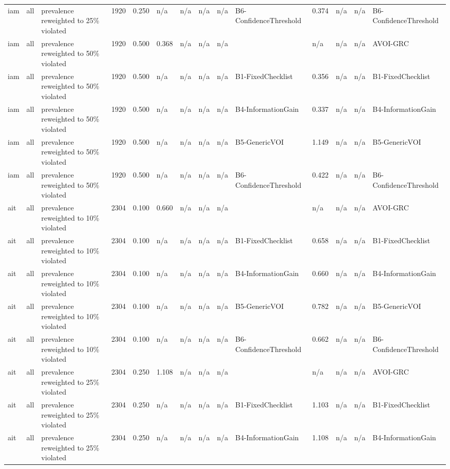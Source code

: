 \begin{table}[!ht]
{\begin{tabular}{llllllllllllll}
iam & all & prevalence reweighted to 25\% violated & 1920 & 0.250 & n/a & n/a & n/a & n/a & B6-ConfidenceThreshold & 0.374 & n/a & n/a & B6-ConfidenceThreshold \\
iam & all & prevalence reweighted to 50\% violated & 1920 & 0.500 & 0.368 & n/a & n/a & n/a &  & n/a & n/a & n/a & AVOI-GRC \\
iam & all & prevalence reweighted to 50\% violated & 1920 & 0.500 & n/a & n/a & n/a & n/a & B1-FixedChecklist & 0.356 & n/a & n/a & B1-FixedChecklist \\
iam & all & prevalence reweighted to 50\% violated & 1920 & 0.500 & n/a & n/a & n/a & n/a & B4-InformationGain & 0.337 & n/a & n/a & B4-InformationGain \\
iam & all & prevalence reweighted to 50\% violated & 1920 & 0.500 & n/a & n/a & n/a & n/a & B5-GenericVOI & 1.149 & n/a & n/a & B5-GenericVOI \\
iam & all & prevalence reweighted to 50\% violated & 1920 & 0.500 & n/a & n/a & n/a & n/a & B6-ConfidenceThreshold & 0.422 & n/a & n/a & B6-ConfidenceThreshold \\
ait & all & prevalence reweighted to 10\% violated & 2304 & 0.100 & 0.660 & n/a & n/a & n/a &  & n/a & n/a & n/a & AVOI-GRC \\
ait & all & prevalence reweighted to 10\% violated & 2304 & 0.100 & n/a & n/a & n/a & n/a & B1-FixedChecklist & 0.658 & n/a & n/a & B1-FixedChecklist \\
ait & all & prevalence reweighted to 10\% violated & 2304 & 0.100 & n/a & n/a & n/a & n/a & B4-InformationGain & 0.660 & n/a & n/a & B4-InformationGain \\
ait & all & prevalence reweighted to 10\% violated & 2304 & 0.100 & n/a & n/a & n/a & n/a & B5-GenericVOI & 0.782 & n/a & n/a & B5-GenericVOI \\
ait & all & prevalence reweighted to 10\% violated & 2304 & 0.100 & n/a & n/a & n/a & n/a & B6-ConfidenceThreshold & 0.662 & n/a & n/a & B6-ConfidenceThreshold \\
ait & all & prevalence reweighted to 25\% violated & 2304 & 0.250 & 1.108 & n/a & n/a & n/a &  & n/a & n/a & n/a & AVOI-GRC \\
ait & all & prevalence reweighted to 25\% violated & 2304 & 0.250 & n/a & n/a & n/a & n/a & B1-FixedChecklist & 1.103 & n/a & n/a & B1-FixedChecklist \\
ait & all & prevalence reweighted to 25\% violated & 2304 & 0.250 & n/a & n/a & n/a & n/a & B4-InformationGain & 1.108 & n/a & n/a & B4-InformationGain \\

\end{tabular}}
\end{table}
